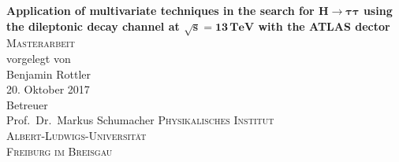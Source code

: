 \begin{titlepage}
\begin{center}
    {\huge \textbf{Application of multivariate techniques in the search for $\bm{H \to \tau\tau}$ using the dileptonic decay channel at $\bm{\sqrt{s} = 13\,\text{TeV}}$ with the ATLAS dector}}\\[2cm]

	\textsc{\LARGE Masterarbeit}\\[2cm]

    {\large vorgelegt von}\\[0.5cm]
    {\Large Benjamin Rottler} \\[0.5cm]
    {\large 20. Oktober 2017} \\[2cm]

    {\large Betreuer}\\[0.5cm]
    {\Large Prof.\ Dr.\ Markus Schumacher}
  	\vfill
	\large
	\textsc{Physikalisches Institut} \\
	\textsc{Albert-Ludwigs-Universität} \\
	\textsc{Freiburg im Breisgau} \\[1cm]
\end{center}
\end{titlepage}
